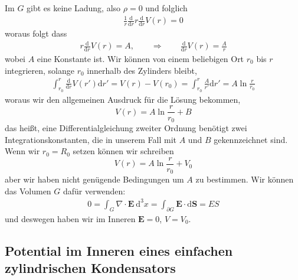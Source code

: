 \documentclass[A4paper, 12pt]{amsart}
\begin{document}
Im $ G $ gibt es keine Ladung, also $ \rho =0 $ und folglich
%
\begin{align*}
  \frac{1}{r}
  \frac{\mathrm{d}}{\mathrm{d}r}
  r
  \frac{\mathrm{d}}{\mathrm{d}r}
  V(r)
  =0
\end{align*}
%
woraus folgt dass
\begin{align*}
  r
  \frac{\mathrm{d}}{\mathrm{d}r}
  V(r)
  = A,
  \qquad \Rightarrow \qquad
  \frac{\mathrm{d}}{\mathrm{d}r}
  V(r)
  =
  \frac{A}{r}
\end{align*}
wobei $ A $ eine Konstante ist.
Wir können von einem beliebigen Ort $ r_{0} $ bis $ r $ integrieren, solange
$ r_{0} $ innerhalb des Zylinders bleibt,
%
\begin{align*}
  \int_{r_{0}}^{r}
    \frac{\mathrm{d}}{\mathrm{d}r}
    V(r')
  \mathrm{d} r' =
  V(r) - V(r_{0}) =
  \int_{r_{0}}^{r}
    \frac{A}{r'}
  \mathrm{d} r' =
  A \ln \frac{r}{r_{0}}
\end{align*}
%
woraus wir den allgemeinen Ausdruck für die Lösung bekommen,
%
\begin{equation}
  V(r) =
  A \ln \frac{r}{r_{0}}
  +
  B
\end{equation}
%
das heißt, eine Differentialgleichung zweiter Ordnung benötigt
zwei Integrationskonstanten, die in unserem Fall mit $ A $ und $ B $
gekennzeichnet sind.
Wenn wir $ r_{0} = R_{0}$ setzen können wir schreiben
\begin{equation}
  V(r) =
  A \ln \frac{r}{r_{0}}
  +
  V_{0}
\end{equation}
aber wir haben nicht genügende Bedingungen um $ A $ zu bestimmen.
Wir können das Volumen $ G $ dafür verwenden:
%
\begin{align*}
  0
  =
  \int_{G}
    \nabla \cdot \mathbf{E}
  \ \mathrm{d}^{3} x
  =
  \int_{\partial G}
    \mathbf{E} \cdot \mathrm{d}\mathbf{S}
  =
  E S
\end{align*}
%
und deswegen haben wir im Inneren $ \mathbf{E} = 0 $, $ V = V_{0} $.

\subsection{Potential im Inneren eines einfachen zylindrischen Kondensators}

\begin{center}
\end{center}
\end{document}
